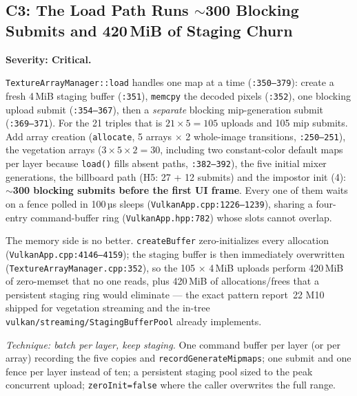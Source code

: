 \documentclass[11pt,a4paper]{article}
\begin{document}
\subsection{C3: The Load Path Runs $\sim$300 Blocking Submits and 420\,MiB of Staging Churn}
\label{sec:c3}

\textbf{Severity: Critical.}

\texttt{TextureArrayManager::load} handles one map at a time
(\texttt{:350--379}): create a fresh 4\,MiB staging buffer
(\texttt{:351}), \texttt{memcpy} the decoded pixels (\texttt{:352}), one
blocking upload submit (\texttt{:354--367}), then a \emph{separate} blocking
mip-generation submit (\texttt{:369--371}). For the 21 triples that is
$21 \times 5 = 105$ uploads and 105 mip submits. Add array creation
(\texttt{allocate}, 5 arrays $\times$ 2 whole-image transitions,
\texttt{:250--251}), the vegetation arrays ($3 \times 5 \times 2 = 30$,
including two constant-color default maps per layer because
\texttt{load()} fills absent paths, \texttt{:382--392}), the five initial mixer
generations, the billboard path (H5: 27 + 12 submits) and the impostor init
(4): \textbf{$\sim$300 blocking submits before the first UI frame}. Every one
of them waits on a fence polled in 100\,µs sleeps
(\texttt{VulkanApp.cpp:1226--1239}), sharing a four-entry command-buffer ring
(\texttt{VulkanApp.hpp:782}) whose slots cannot overlap.

The memory side is no better. \texttt{createBuffer} zero-initializes every
allocation (\texttt{VulkanApp.cpp:4146--4159}); the staging buffer is then
immediately overwritten (\texttt{TextureArrayManager.cpp:352}), so the 105
$\times$ 4\,MiB uploads perform 420\,MiB of zero-memset that no one reads, plus
420\,MiB of allocations/frees that a persistent staging ring would eliminate ---
the exact pattern report~22 M10 shipped for vegetation streaming and the
in-tree \texttt{vulkan/streaming/}\allowbreak\texttt{StagingBufferPool} already
implements.

\textit{Technique: batch per layer, keep staging.} One command buffer per layer
(or per array) recording the five copies and \texttt{recordGenerateMipmaps};
one submit and one fence per layer instead of ten; a persistent staging pool
sized to the peak concurrent upload; \texttt{zeroInit=false} where the caller
overwrites the full range.
\end{document}
